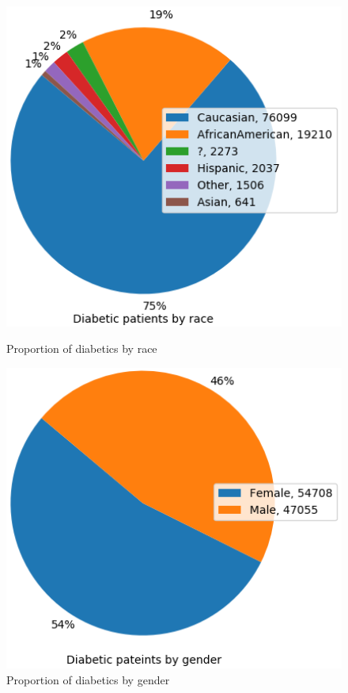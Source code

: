 \documentclass[11pt]{report}
\begin{document}
\begin{figure}[ht]
	\begin{minipage}[b]{.4\textwidth}
	\centering
	\includegraphics[width=1\textwidth]{race_pie.png}
	\caption{Proportion of diabetics by race}
	\end{minipage}
	\hfill
	\begin{minipage}[b]{.4\textwidth}
	\centering
	\includegraphics[width=1\textwidth]{gender_pie.png}
\caption{Proportion of diabetics by gender}
\end{minipage}
\end{figure}
\end{document}
